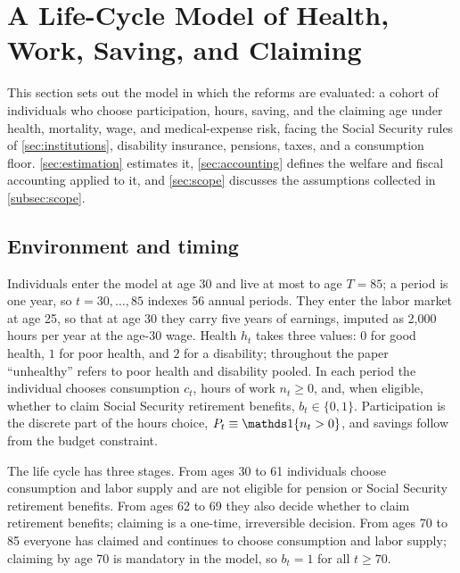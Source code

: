 \section{A Life-Cycle Model of Health, Work, Saving, and Claiming}\label{sec:model}

This section sets out the model in which the reforms are evaluated: a cohort of individuals who choose participation, hours, saving, and the claiming age under health, mortality, wage, and medical-expense risk, facing the Social Security rules of \autoref{sec:institutions}, disability insurance, pensions, taxes, and a consumption floor. \autoref{sec:estimation} estimates it, \autoref{sec:accounting} defines the welfare and fiscal accounting applied to it, and \autoref{sec:scope} discusses the assumptions collected in \autoref{subsec:scope}.

\subsection{Environment and timing}\label{subsec:environment}

Individuals enter the model at age 30 and live at most to age $T=85$; a period is one year, so $t=30,\dots,85$ indexes 56 annual periods. %
They enter the labor market at age 25, so that at age 30 they carry five years of earnings, imputed as 2,000 hours per year at the age-30 wage. %
Health $h_t$ takes three values: $0$ for good health, $1$ for poor health, and $2$ for a disability; throughout the paper ``unhealthy'' refers to poor health and disability pooled. %
In each period the individual chooses consumption $c_t$, hours of work $n_t\geq 0$, and, when eligible, whether to claim Social Security retirement benefits, $b_t\in\{0,1\}$. Participation is the discrete part of the hours choice, $P_t\equiv\ind{n_t>0}$, and savings follow from the budget constraint.

The life cycle has three stages. %
From ages 30 to 61 individuals choose consumption and labor supply and are not eligible for pension or Social Security retirement benefits. %
From ages 62 to 69 they also decide whether to claim retirement benefits; claiming is a one-time, irreversible decision. %
From ages 70 to 85 everyone has claimed and continues to choose consumption and labor supply; claiming by age 70 is mandatory in the model, so $b_t=1$ for all $t\geq 70$. %

